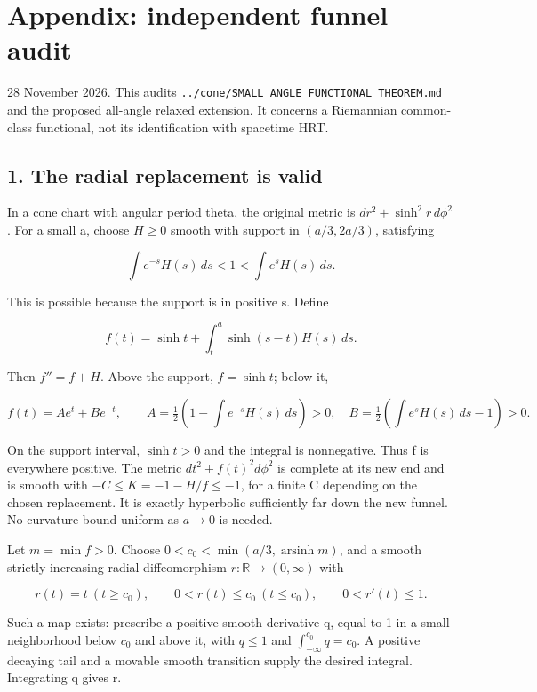 \documentclass[11pt]{article}
\begin{document}
\clearpage

\section{Appendix: independent funnel
audit}\label{appendix-independent-funnel-audit}

28 November 2026. This audits
\texttt{../cone/SMALL\_\allowbreak ANGLE\_\allowbreak FUNCTIONAL\_\allowbreak THEOREM.md} and the proposed
all-angle relaxed extension. It concerns a Riemannian common-class
functional, not its identification with spacetime HRT.

\subsection{1. The radial replacement is
valid}\label{the-radial-replacement-is-valid}

In a cone chart with angular period theta, the original metric is
\(dr^2+\sinh^2r\,d\phi^2\). For a small a, choose \(H\ge0\) smooth with
support in \((a/3,2a/3)\), satisfying

\[
\int e^{-s}H(s)\,ds<1<\int e^sH(s)\,ds.
\]

This is possible because the support is in positive s. Define

\[
f(t)=\sinh t+\int_t^a\sinh(s-t)H(s)\,ds.
\]

Then \(f''=f+H\). Above the support, \(f=\sinh t\); below it,

\[
f(t)=Ae^t+Be^{-t},\qquad
A=\tfrac12\left(1-\int e^{-s}H(s)\,ds\right)>0,
\quad B=\tfrac12\left(\int e^sH(s)\,ds-1\right)>0.
\]

On the support interval, \(\sinh t>0\) and the integral is nonnegative.
Thus f is everywhere positive. The metric \(dt^2+f(t)^2d\phi^2\) is
complete at its new end and is smooth with \(-C\le K=-1-H/f\le-1\), for
a finite C depending on the chosen replacement. It is exactly hyperbolic
sufficiently far down the new funnel. No curvature bound uniform as
\(a\to0\) is needed.

Let \(m=\min f>0\). Choose \(0<c_0<\min(a/3,\operatorname{arsinh}m)\),
and a smooth strictly increasing radial diffeomorphism
\(r:\mathbb R\to(0,\infty)\) with

\[
r(t)=t\ (t\ge c_0),\qquad
0<r(t)\le c_0\ (t\le c_0),\qquad 0<r'(t)\le1.
\]

Such a map exists: prescribe a positive smooth derivative q, equal to 1
in a small neighborhood below \(c_0\) and above it, with \(q\le1\) and
\(\int_{-\infty}^{c_0}q=c_0\). A positive decaying tail and a movable
smooth transition supply the desired integral. Integrating q gives r.
\end{document}

